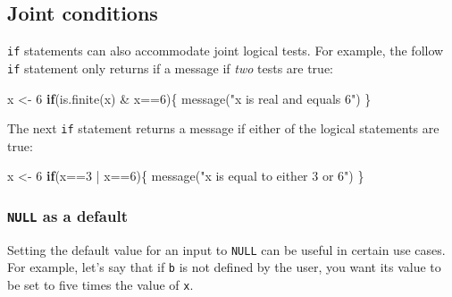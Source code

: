 \documentclass[
]{book}
\newenvironment{Shaded}{\begin{snugshade}}{\end{snugshade}}
\newcommand{\ControlFlowTok}[1]{\textcolor[rgb]{0.13,0.29,0.53}{\textbf{#1}}}
\newcommand{\DecValTok}[1]{\textcolor[rgb]{0.00,0.00,0.81}{#1}}
\newcommand{\FunctionTok}[1]{\textcolor[rgb]{0.00,0.00,0.00}{#1}}
\newcommand{\NormalTok}[1]{#1}
\newcommand{\OtherTok}[1]{\textcolor[rgb]{0.56,0.35,0.01}{#1}}
\newcommand{\SpecialCharTok}[1]{\textcolor[rgb]{0.00,0.00,0.00}{#1}}
\newcommand{\StringTok}[1]{\textcolor[rgb]{0.31,0.60,0.02}{#1}}
\begin{document}
\hypertarget{joint-conditions}{%
\subsection*{Joint conditions}\label{joint-conditions}}

\texttt{if} statements can also accommodate joint logical tests. For example, the follow \texttt{if} statement only returns if a message if \emph{two} tests are true:

\begin{Shaded}
\begin{Highlighting}[]
\NormalTok{x }\OtherTok{\textless{}{-}} \DecValTok{6}
\ControlFlowTok{if}\NormalTok{(}\FunctionTok{is.finite}\NormalTok{(x) }\SpecialCharTok{\&}\NormalTok{ x}\SpecialCharTok{==}\DecValTok{6}\NormalTok{)\{}
  \FunctionTok{message}\NormalTok{(}\StringTok{"x is real and equals 6"}\NormalTok{)}
\NormalTok{\}}
\end{Highlighting}
\end{Shaded}

The next \texttt{if} statement returns a message if either of the logical statements are true:

\begin{Shaded}
\begin{Highlighting}[]
\NormalTok{x }\OtherTok{\textless{}{-}} \DecValTok{6}
\ControlFlowTok{if}\NormalTok{(x}\SpecialCharTok{==}\DecValTok{3} \SpecialCharTok{|}\NormalTok{ x}\SpecialCharTok{==}\DecValTok{6}\NormalTok{)\{}
  \FunctionTok{message}\NormalTok{(}\StringTok{"x is equal to either 3 or 6"}\NormalTok{)}
\NormalTok{\}}
\end{Highlighting}
\end{Shaded}

\hypertarget{null-as-a-default}{%
\subsubsection*{\texorpdfstring{\texttt{NULL} as a default}{NULL as a default}}\label{null-as-a-default}}

Setting the default value for an input to \texttt{NULL} can be useful in certain use cases. For example, let's say that if \texttt{b} is not defined by the user, you want its value to be set to five times the value of \texttt{x}.
\end{document}
